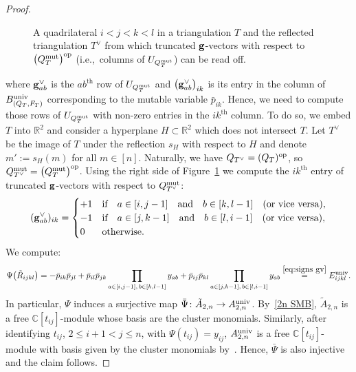 \documentclass[10pt,a4paper]{amsart}
\newcommand{\thref}[1]{\ref{#1}}
\numberwithin{equation}{section}
\begin{document}
\begin{proof}
\begin{figure}
 \caption{A quadrilateral $i<j<k<l$ in a triangulation $T$ and the reflected triangulation $T^\vee$ from which truncated ${\bf g}$-vectors with respect to $\big(Q_T^{\rm mut}\big)^{\rm op}$ (i.e.,~columns of $U_{Q_T^{\rm mut}}$) can be read off.}
 \label{fig:ex rel Auniv}
\end{figure}\noindent
where ${\bf g}^\vee_{ab}$ is the $ab^{\text{th}}$ row of $U_{Q_T^{\rm mut}}$ and $\big({\bf g}^\vee_{ab}\big)_{ik}$ is its entry in the column of $B_{(Q_T,F_T)}^{\rm univ}$ corresponding to the mutable variable $\bar p_{ik}$.
Hence, we need to compute those rows of $U_{Q_T^{\rm mut}}$ with non-zero entries in the $ik^{\text{th}}$ column.
To do so, we embed $T$ into $\mathbb R^2$ and consider a hyperplane $H\subset \mathbb R^2$ which does not intersect $T$.
Let $T^\vee$ be the image of $T$ under the reflection $s_H$ with respect to $H$ and denote $m':=s_H(m)$ for all $m\in [n]$.
Naturally, we have $Q_{T^\vee}=(Q_T)^{\rm op}$, so $Q^{\rm mut}_{T^\vee}=\big(Q_T^{\rm mut}\big)^{\rm op}$.
Using the right side of Figure~\ref{fig:ex rel Auniv} we compute the $ik^{\text{th}}$ entry of truncated ${\bf g}$-vectors with respect to $Q^{\rm mut}_{T^{\vee}}$:\vspace{-1ex}
\begin{equation}\label{eq:signs gv}
({\bf g}^\vee_{ab})_{ik} =
\begin{cases}
 +1 & \text{if}\quad a\in[i,j-1]\quad \text{and}\quad b\in [k,l-1]\quad \text{(or vice versa)},\\
 -1 & \text{if}\quad a\in[j,k-1]\quad \text{and}\quad b\in [l,i-1]\quad \text{(or vice versa)},\\
 0 & \text{otherwise}.
\end{cases}
\end{equation}
We compute:\vspace{-1ex}
\begin{displaymath}
\Psi\big(\tilde R_{ijkl}\big)
= - \bar p_{ik}\bar p_{jl} + \bar p_{il}\bar p_{jk} \prod_{a\in[i,j-1],\,b\in[k,l-1]} y_{ab} + \bar p_{ij}\bar p_{kl} \prod_{a\in[j,k-1],\,b\in[l,i-1]} y_{ab} \overset{\eqref{eq:signs gv}}{=} E_{ijkl}^{\rm univ}.
\end{displaymath}
In particular, $\Psi$ induces a surjective map $\bar \Psi\colon \tilde A_{2,n} \to A_{2,n}^{\rm univ}$.
By~\thref{2n SMB}, $\tilde A_{2,n}$ is a free $\mathbb C[t_{ij}]$-module whose basis are the cluster monomials.
Similarly, after identifying $t_{ij}$, $2\le i+1<j\le n$, with $\Psi(t_{ij})=y_{ij}$, $A_{2,n}^{\rm univ}$ is a free $\mathbb C[t_{ij}]$-module with basis given by the cluster monomials by~\cite[Theorem~0.3 and p.~502]{GHKK}.
Hence, $\bar \Psi$ is also injective and the claim follows.
\end{proof}
\end{document}
